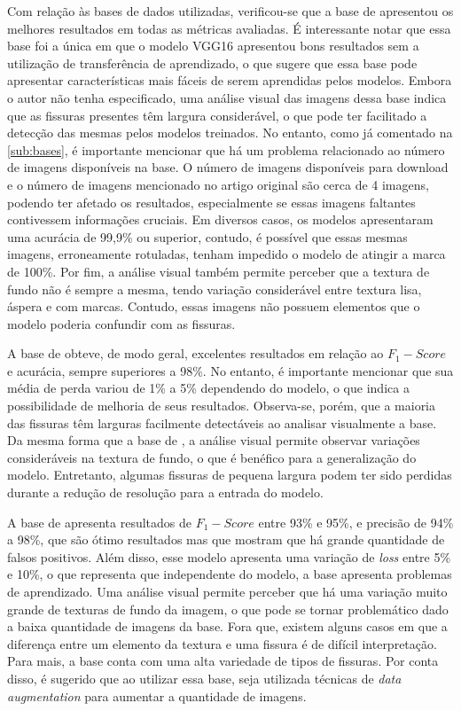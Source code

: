 Com relação às bases de dados utilizadas, verificou-se que a base de  apresentou os melhores resultados em todas as métricas avaliadas. 
É interessante notar que essa base foi a única em que o modelo VGG16 apresentou bons resultados sem a utilização de transferência de aprendizado, o que sugere que essa base pode apresentar características mais fáceis de serem aprendidas pelos modelos.
Embora o autor não tenha especificado, uma análise visual das imagens dessa base indica que as fissuras presentes têm largura considerável, o que pode ter facilitado a detecção das mesmas pelos modelos treinados.
No entanto, como já comentado na \autoref{sub:bases}, é importante mencionar que há um problema relacionado ao número de imagens disponíveis na base. 
O número de imagens disponíveis para download e o número de imagens mencionado no artigo original são cerca de 4 imagens, podendo ter afetado os resultados, especialmente se essas imagens faltantes contivessem informações cruciais.
Em diversos casos, os modelos apresentaram uma acurácia de 99,9\% ou superior, contudo, é possível que essas mesmas imagens, erroneamente rotuladas, tenham impedido o modelo de atingir a marca de 100\%.
Por fim, a análise visual também permite perceber que a textura de fundo não é sempre a mesma, tendo variação considerável entre textura lisa, áspera e com marcas.
Contudo, essas imagens não possuem elementos que o modelo poderia confundir com as fissuras.


A base de  obteve, de modo geral, excelentes resultados em relação ao $F_{1}-Score$ e acurácia, sempre superiores a 98\%. 
No entanto, é importante mencionar que sua média de perda variou de 1\% a 5\% dependendo do modelo, o que indica a possibilidade de melhoria de seus resultados. 
Observa-se, porém, que a maioria das fissuras têm larguras facilmente detectáveis ao analisar visualmente a base.
Da mesma forma que a base de , a análise visual permite observar variações consideráveis na textura de fundo, o que é benéfico para a generalização do modelo.
Entretanto, algumas fissuras de pequena largura podem ter sido perdidas durante a redução de resolução para a entrada do modelo. 

A base de  apresenta resultados de $F_{1}-Score$ entre 93\% e 95\%, e precisão de 94\% a 98\%, que são ótimo resultados mas que mostram que há grande quantidade de falsos positivos.
Além disso, esse modelo apresenta uma variação de \textit{loss} entre 5\% e 10\%, o que representa que independente do modelo, a base apresenta problemas de aprendizado.
Uma análise visual permite perceber que há uma variação muito grande de texturas de fundo da imagem, o que pode se tornar problemático dado a baixa quantidade de imagens da base.
Fora que, existem alguns casos em que a diferença entre um elemento da textura e uma fissura é de difícil interpretação.
Para mais, a base conta com uma alta variedade de tipos de fissuras.
Por conta disso, é sugerido que ao utilizar essa base, seja utilizada técnicas de \textit{data augmentation} para aumentar a quantidade de imagens.


